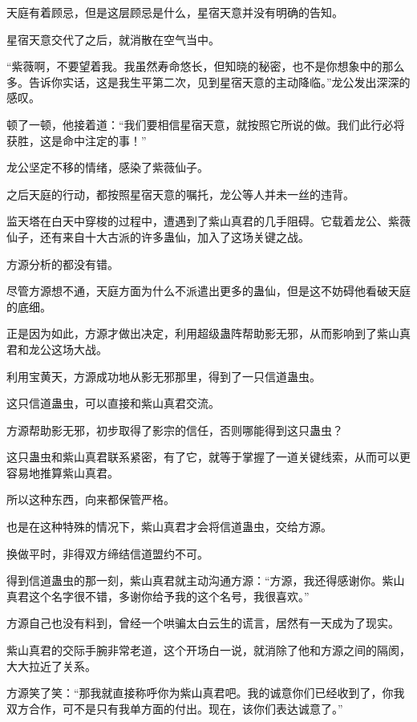 
\begin{this_body}



天庭有着顾忌，但是这层顾忌是什么，星宿天意并没有明确的告知。

星宿天意交代了之后，就消散在空气当中。

“紫薇啊，不要望着我。我虽然寿命悠长，但知晓的秘密，也不是你想象中的那么多。告诉你实话，这是我生平第二次，见到星宿天意的主动降临。”龙公发出深深的感叹。

顿了一顿，他接着道：“我们要相信星宿天意，就按照它所说的做。我们此行必将获胜，这是命中注定的事！”

龙公坚定不移的情绪，感染了紫薇仙子。

之后天庭的行动，都按照星宿天意的嘱托，龙公等人并未一丝的违背。

监天塔在白天中穿梭的过程中，遭遇到了紫山真君的几手阻碍。它载着龙公、紫薇仙子，还有来自十大古派的许多蛊仙，加入了这场关键之战。

方源分析的都没有错。

尽管方源想不通，天庭方面为什么不派遣出更多的蛊仙，但是这不妨碍他看破天庭的底细。

正是因为如此，方源才做出决定，利用超级蛊阵帮助影无邪，从而影响到了紫山真君和龙公这场大战。

利用宝黄天，方源成功地从影无邪那里，得到了一只信道蛊虫。

这只信道蛊虫，可以直接和紫山真君交流。

方源帮助影无邪，初步取得了影宗的信任，否则哪能得到这只蛊虫？

这只蛊虫和紫山真君联系紧密，有了它，就等于掌握了一道关键线索，从而可以更容易地推算紫山真君。

所以这种东西，向来都保管严格。

也是在这种特殊的情况下，紫山真君才会将信道蛊虫，交给方源。

换做平时，非得双方缔结信道盟约不可。

得到信道蛊虫的那一刻，紫山真君就主动沟通方源：“方源，我还得感谢你。紫山真君这个名字很不错，多谢你给予我的这个名号，我很喜欢。”

方源自己也没有料到，曾经一个哄骗太白云生的谎言，居然有一天成为了现实。

紫山真君的交际手腕非常老道，这个开场白一说，就消除了他和方源之间的隔阂，大大拉近了关系。

方源笑了笑：“那我就直接称呼你为紫山真君吧。我的诚意你们已经收到了，你我双方合作，可不是只有我单方面的付出。现在，该你们表达诚意了。”


\end{this_body}

